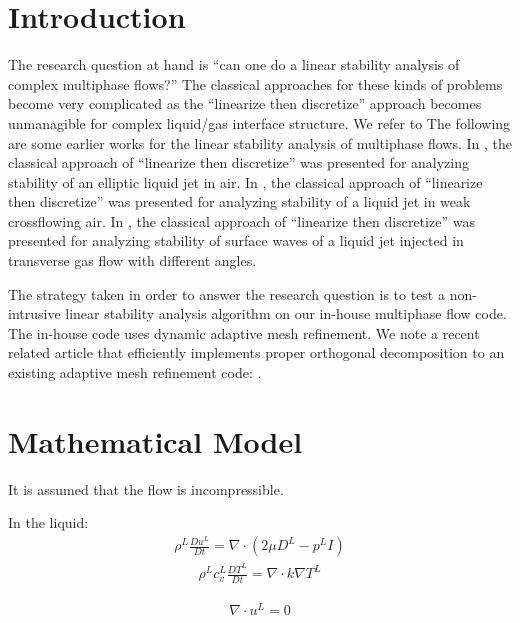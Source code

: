 \documentclass[]{article}
\begin{document}
\section{Introduction}
The research question at hand is ``can one do a linear stability analysis
of complex multiphase flows?''  The classical approaches for these
kinds of problems become very complicated as the ``linearize then
discretize'' approach becomes unmanagible for complex liquid/gas interface
structure.   We refer to 
The following are some earlier works for the linear stability 
analysis of multiphase flows.   
In \cite{amini2014instability},
the classical approach of ``linearize then discretize'' was presented for
analyzing stability of an elliptic liquid jet in air.
In \cite{10.1063/1.5043589},
the classical approach of ``linearize then discretize'' was presented for
analyzing stability of a liquid jet in weak crossflowing air.
In \cite{kasmaiee2024linear},
the classical approach of ``linearize then discretize'' was presented for
analyzing stability of surface waves of a liquid jet injected in
transverse gas flow with different angles.

The strategy taken in order to answer the research question is to test
a non-intrusive linear stability analysis algorithm\cite{RANJAN2020109076}
on our in-house multiphase flow code.  The in-house code uses 
dynamic adaptive mesh refinement.  We note a recent related article that
efficiently implements proper orthogonal decomposition to an 
existing adaptive mesh refinement code: \cite{MEEHAN2022111527}.


\section{Mathematical Model}

\par\noindent
It is assumed that the flow is incompressible. 

\par\noindent
In the liquid:
\begin{eqnarray}
	\rho^{L}\frac{Du^{L}}{Dt}=\nabla\cdot(2\mu D^{L}-p^{L}I)
\end{eqnarray}
\begin{eqnarray}
        \rho^{L}c_{v}^{L}\frac{DT^{L}}{Dt}=\nabla\cdot k\nabla T^{L}
\end{eqnarray}

\begin{eqnarray}
	\nabla\cdot u^{L}=0
\end{eqnarray}
\end{document}

